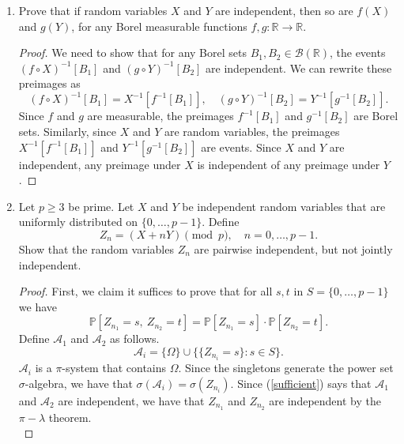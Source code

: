 \documentclass[11pt,letterpaper]{report}
\newcommand{\reals}{\mathbb{R}}
\newcommand{\mcal}[1]{\mathcal{#1}}
\newcommand{\Prob}{\mathbb{P}}
\begin{document}
\begin{enumerate}
\begin{proof}
		\noindent Suppose that these events live in a discrete probability space $\Omega$ (equipped with the power set $\sigma$-algebra). Since $\Omega$ is discrete, there must be some $\omega\in \Omega$ with $\Prob[\{\omega\}] > 0$. Define the sequence of events $E_n$ by
		\[
		E_n = \begin{cases}
			A_n^c,&\text{if }\omega\in A_n\\
			A_n,&\text{if }\omega \notin A_n.
		\end{cases}
		\]
		In particular, each $E_n$ misses $\omega$ and the $E_n$'s are independent. We also have that
		\[
		\sum \Prob[E_n] \geq \sum\alpha_n = \infty.
		\]
		By our strengthened Borel-Cantelli lemma, $\Prob[\limsup E_n] = 1$. By discreteness, we must then have that $\Omega = \limsup E_n$. But $\omega$, which has positive probability, isn't in $\limsup E_n$ -- a contradiction. We conclude that $\Omega$ is not discrete.
	\end{proof}

	\item Prove that if random variables $X$ and $Y$ are independent, then so are $f(X)$ and $g(Y)$, for any Borel measurable functions $f,g:\reals\to \reals$.
	\begin{proof}
		We need to show that for any Borel sets $B_1, B_2\in \mcal{B}(\reals)$, the events $(f\circ X)^{-1}[B_1]$ and $(g\circ Y)^{-1}[B_2]$ are independent. We can rewrite these preimages as
		\[
		(f\circ X)^{-1}[B_1] = X^{-1}[f^{-1}[B_1]],\quad (g\circ Y)^{-1}[B_2] = Y^{-1}[g^{-1}[B_2]].
		\]
		Since $f$ and $g$ are measurable, the preimages $f^{-1}[B_1]$ and $g^{-1}[B_2]$ are Borel sets. Similarly, since $X$ and $Y$ are random variables, the preimages $X^{-1}[f^{-1}[B_1]]$ and $Y^{-1}[g^{-1}[B_2]]$ are events. Since $X$ and $Y$ are independent, any preimage under $X$ is independent of any preimage under $Y$.
	\end{proof}

	\item Let $p\geq 3$ be prime. Let $X$ and $Y$ be independent random variables that are uniformly distributed on $\{0, \ldots, p-1\}$. Define
	\[
	Z_n = (X+nY)\pmod{p},\quad n = 0, \ldots, p-1.
	\]
	Show that the random variables $Z_n$ are pairwise independent, but not jointly independent.
	\begin{proof}
		First, we claim it suffices to prove that for all $s,t$ in $S = \{0, \ldots, p-1\}$ we have
		\begin{equation}\label{sufficient}
		\Prob[Z_{n_1} = s,\ Z_{n_2} = t] = \Prob[Z_{n_1} = s]\cdot \Prob[Z_{n_2} = t].
		\end{equation}
		Define $\mcal{A}_1$ and $\mcal{A}_2$ as follows.
		\[
		\mcal{A}_i = \{\Omega\}\cup \big\{\{Z_{n_i} = s\}: s\in S\big\}.
		\]
		$\mcal{A}_i$ is a $\pi$-system that contains $\Omega$. Since the singletons generate the power set $\sigma$-algebra, we have that $\sigma(\mcal{A}_i) = \sigma(Z_{n_i})$. Since (\ref{sufficient}) says that $\mcal{A}_1$ and $\mcal{A}_2$ are independent, we have that $Z_{n_1}$ and $Z_{n_2}$ are independent by the $\pi-\lambda$ theorem.\\


\end{proof}
\end{enumerate}
\end{document}
